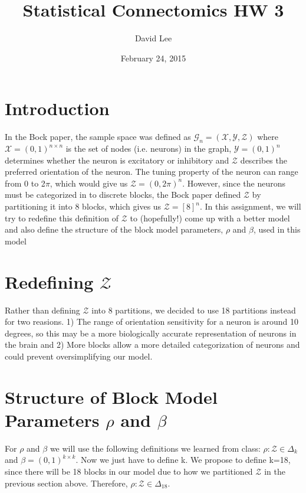 \documentclass[12pt]{article}
\title{Statistical Connectomics HW 3}
\author{David Lee}
\date{February 24, 2015}
\begin{document}
\maketitle

\section{Introduction}

In the Bock paper, the sample space was defined as $\mathscr{G} _n= (\mathscr{X}, \mathscr{Y}, \mathscr{Z})$ where $\mathscr{X}=(0,1)^{n\times n}$ is the set of nodes (i.e. neurons) in the graph, $\mathscr{Y}=(0,1)^{n}$ determines whether the neuron is excitatory or inhibitory and  $\mathscr{Z}$ describes the preferred orientation of the neuron.  The tuning property of the neuron can range from 0 to 2$\pi$, which would give us  $\mathscr{Z} =(0, 2\pi)^{n}$.  However, since the neurons must be categorized in to discrete blocks, the Bock paper defined $\mathscr{Z}$ by partitioning it into 8 blocks, which gives us $\mathscr{Z}=[8]^{n}$.  In this assignment, we will try to redefine this definition of  $\mathscr{Z}$ to (hopefully!) come up with a better model and also define the structure of the block model parameters, $\rho$ and $\beta$, used in this model

\section{Redefining  $\mathscr{Z}$}
Rather than defining $\mathscr{Z}$ into 8 partitions, we decided to use 18 partitions instead for two reasions. 1) The range of orientation sensitivity for a neuron is around 10 degrees, so this may be a more biologically accurate representation of neurons in the brain and 2) More blocks allow a more detailed categorization of neurons and could prevent oversimplifying our model.

\section{Structure of Block Model Parameters $\rho$ and $\beta$}
For $\rho$ and $\beta$ we will use the following definitions we learned from class: $\rho: \mathscr{Z} \in \Delta_{k}$ and $\beta = (0,1)^{k \times k}$.  Now we just have to define k.  We propose to define k=18, since there will be 18 blocks in our model due to how we partitioned $\mathscr{Z}$ in the previous section above.  Therefore,  $\rho: \mathscr{Z} \in \Delta_{18}$.
\end{document}
